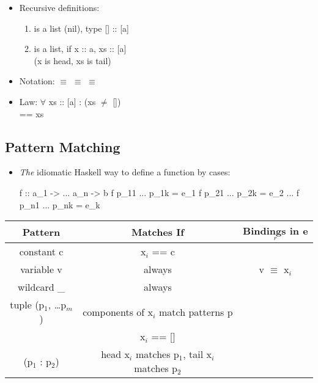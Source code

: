 \begin{itemize}
  \item Recursive definitions:
  \begin{enumerate}
      \item \codeline{[]} is a list (nil), type [] :: [a]
      \item {} is a list, if x :: a, xs :: [a] \\ (x is head, xs is tail)
  \end{enumerate}
  \item Notation:  $\equiv$  $\equiv$ \codeline{[3,2,1]} $\equiv$ 
  \item Law: $\forall$ xs :: [a] :   \hspace{1cm} (xs $\neq$ []) \\
       == xs
\end{itemize}




\subsection{Pattern Matching}

\begin{itemize}
  \item \textit{The} idiomatic Haskell way to define a function by cases:
  \begin{codebox}[haskell]
f :: a_1 -> ... a_n -> b
f p_11 ... p_1k = e_1
f p_21 ... p_2k = e_2
...
f p_n1 ... p_nk = e_k
  \end{codebox}

\end{itemize}

\vspace{9pt}\begin{center}\begin{tabular}{|c|c|c|}\hline
\rowcolor{grau}   Pattern         & Matches If                & Bindings in e$_r$     \\\hline
                  constant c      & x$_i$ == c                  &                     \\\hline
                  variable v      & always                    & v $\equiv$ x$_i$      \\\hline
                  wildcard \_      & always                    &                       \\\hline
                  tuple (p$_1$, \dots p$_m$)  & components of x$_i$ match patterns p    & \\\hline
                  []              & x$_i$ == []                 &                     \\\hline
                  (p$_1$ : p$_2$)     & head x$_i$ matches p$_1$, tail x$_i$ matches p$_2$    & \\\hline
\end{tabular}\end{center}\vspace{9pt}


